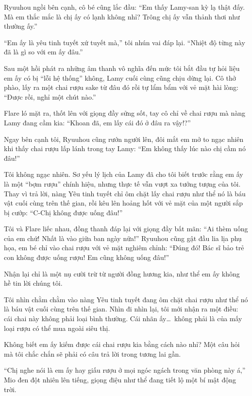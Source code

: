 \documentclass[../main.tex]{subfiles}
\begin{document}
Ryuuhou ngồi bên cạnh, cô bé cũng lắc đầu: ``Em thấy Lamy-san kỳ lạ thật đấy. Mà em thắc mắc là chị ấy có lạnh không nhỉ? Trông chị ấy vẫn thảnh thơi như thường ấy.''

``Em ấy là yêu tinh tuyết xứ tuyết mà,'' tôi nhún vai đáp lại. ``Nhiệt độ từng này đã là gì so với em ấy đâu.''

Sau một hồi phát ra những âm thanh vô nghĩa đến mức tôi bắt đầu tự hỏi liệu em ấy có bị ``lỗi hệ thống'' không, Lamy cuối cùng cũng chịu dừng lại. Cô thở phào, lấy ra một chai rượu sake từ đâu đó rồi tự lẩm bẩm với vẻ mặt hài lòng: ``Được rồi, nghỉ một chút nào.''

Flare ló mặt ra, thốt lên với giọng đầy sửng sốt, tay cô chỉ về chai rượu mà nàng Lamy đang cầm kia: ``Khoan đã, em lấy cái đó ở đâu ra vậy!?''

Ngay bên cạnh tôi, Ryuuhou cũng rướn người lên, đôi mắt em mở to ngạc nhiên khi thấy chai rượu lấp lánh trong tay Lamy: ``Em không thấy lúc nào chị cầm nó đâu!''

Tôi không ngạc nhiên. Sơ yếu lý lịch của Lamy đã cho tôi biết trước rằng em ấy là một ``bợm rượu'' chính hiệu, nhưng thực tế vẫn vượt xa tưởng tượng của tôi. Thay vì trả lời, nàng Yêu tinh tuyết chỉ ôm chặt lấy chai rượu như thể nó là báu vật cuối cùng trên thế gian, rồi kêu lên hoảng hốt với vẻ mặt của một người sắp bị cướp: ``C-Chị không được uống đâu!''

Tôi và Flare liếc nhau, đồng thanh đáp lại với giọng đầy bất mãn: ``Ai thèm uống của em chứ! Nhất là vào giữa ban ngày nữa!'' Ryuuhou cũng gật đầu lia lịa phụ họa, em bé chỉ vào chai rượu với vẻ mặt nghiêm chỉnh: ``Đúng đó! Bác sĩ bảo trẻ con không được uống rượu! Em cũng không uống đâu!''

Nhận lại chỉ là một nụ cười trừ từ người đồng hương kia, như thể em ấy không hề tin lời chúng tôi.

Tôi nhìn chằm chằm vào nàng Yêu tinh tuyết đang ôm chặt chai rượu như thể nó là báu vật cuối cùng trên thế gian. Nhìn đi nhìn lại, tôi mới nhận ra một điều:  cái chai này không phải loại bình thường. Cái nhãn ấy\dots\ không phải là của mấy loại rượu có thể mua ngoài siêu thị.

Không biết em ấy kiếm được cái chai rượu kia bằng cách nào nhỉ? Một câu hỏi mà tôi chắc chắn sẽ phải có câu trả lời trong tương lai gần.

``Chị nghe nói là em ấy hay giấu rượu ở mọi ngóc ngách trong văn phòng này á,'' Mio đen đột nhiên lên tiếng, giọng điệu như thể đang tiết lộ một bí mật động trời.
\end{document}
